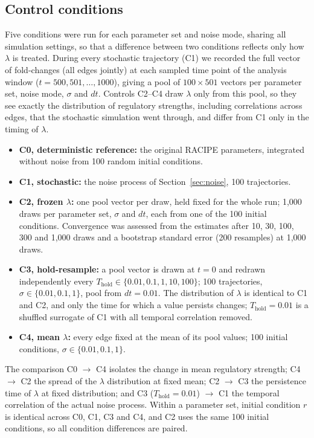 \documentclass[11pt]{article}
\begin{document}
\subsection{Control conditions} \label{sec:controls}
Five conditions were run for each parameter set and noise mode, sharing all simulation settings, so that a difference between two conditions reflects only how $\lambda$ is treated. During every stochastic trajectory (C1) we recorded the full vector of fold-changes (all edges jointly) at each sampled time point of the analysis window ($t = 500, 501, \dots, 1000$), giving a pool of $100 \times 501$ vectors per parameter set, noise mode, $\sigma$ and $dt$. Controls C2--C4 draw $\lambda$ only from this pool, so they see exactly the distribution of regulatory strengths, including correlations across edges, that the stochastic simulation went through, and differ from C1 only in the timing of $\lambda$.
\begin{itemize}
  \item \textbf{C0, deterministic reference:} the original RACIPE parameters, integrated without noise from 100 random initial conditions.
  \item \textbf{C1, stochastic:} the noise process of Section~\ref{sec:noise}, 100 trajectories.
  \item \textbf{C2, frozen $\lambda$:} one pool vector per draw, held fixed for the whole run; 1,000 draws per parameter set, $\sigma$ and $dt$, each from one of the 100 initial conditions. Convergence was assessed from the estimates after 10, 30, 100, 300 and 1,000 draws and a bootstrap standard error (200 resamples) at 1,000 draws.
  \item \textbf{C3, hold-resample:} a pool vector is drawn at $t = 0$ and redrawn independently every $T_\text{hold} \in \{0.01, 0.1, 1, 10, 100\}$; 100 trajectories, $\sigma \in \{0.01, 0.1, 1\}$, pool from $dt = 0.01$. The distribution of $\lambda$ is identical to C1 and C2, and only the time for which a value persists changes; $T_\text{hold} = 0.01$ is a shuffled surrogate of C1 with all temporal correlation removed.
  \item \textbf{C4, mean $\lambda$:} every edge fixed at the mean of its pool values; 100 initial conditions, $\sigma \in \{0.01, 0.1, 1\}$.
\end{itemize}
The comparison C0 $\to$ C4 isolates the change in mean regulatory strength; C4 $\to$ C2 the spread of the $\lambda$ distribution at fixed mean; C2 $\to$ C3 the persistence time of $\lambda$ at fixed distribution; and C3 ($T_\text{hold} = 0.01$) $\to$ C1 the temporal correlation of the actual noise process. Within a parameter set, initial condition $r$ is identical across C0, C1, C3 and C4, and C2 uses the same 100 initial conditions, so all condition differences are paired.
\end{document}
